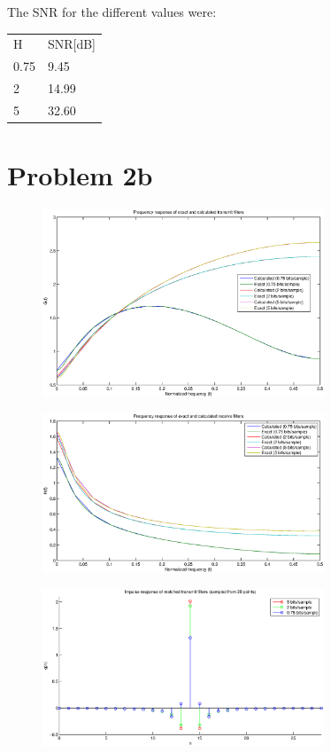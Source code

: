 	The SNR for the different values were:
	\begin{table}
		\centering
		\begin{tabular}{l l}
			H & SNR[dB] \\
			0.75 & 9.45 \\
			2 & 14.99 \\
			5 & 32.60 \\
		\end{tabular}
	\end{table}

\section{Problem 2b}

	
	
	\begin{figure}[H]
	  \centering
	  \includegraphics[width=0.75\textwidth]{img/Oppgave2b_freq_G}
	\end{figure}
	
	\begin{figure}[H]
	  \centering
	  \includegraphics[width=0.75\textwidth]{img/Oppgave2b_freq_H}
	\end{figure}
	
	\begin{figure}[H]
	  \centering
	  \includegraphics[width=0.75\textwidth]{img/Oppgave2b_impulse_G_diskrete_t}
	\end{figure}
	

